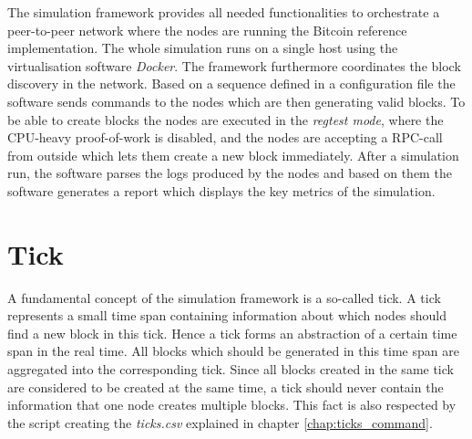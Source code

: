 The simulation framework provides all needed functionalities to orchestrate a peer-to-peer network where the nodes are running the Bitcoin reference implementation.
The whole simulation runs on a single host using the virtualisation software \textit{Docker}.
The framework furthermore coordinates the block discovery in the network.
Based on a sequence defined in a configuration file the software sends commands to the nodes which are then generating valid blocks.
To be able to create blocks the nodes are executed in the \textit{regtest mode}, where the CPU-heavy proof-of-work is disabled, and the nodes are accepting a RPC-call from outside which lets them create a new block immediately.
After a simulation run, the software parses the logs produced by the nodes and based on them the software generates a report which displays the key metrics of the simulation.


  
\section{Tick}
\label{chap:tick}

A fundamental concept of the simulation framework is a so-called tick.
A tick represents a small time span containing information about which nodes should find a new block in this tick.
Hence a tick forms an abstraction of a certain time span in the real time.
All blocks which should be generated in this time span are aggregated into the corresponding tick.
Since all blocks created in the same tick are considered to be created at the same time, a tick should never contain the information that one node creates multiple blocks.
This fact is also respected by the script creating the \textit{ticks.csv} explained in chapter \ref{chap:ticks_command}.

